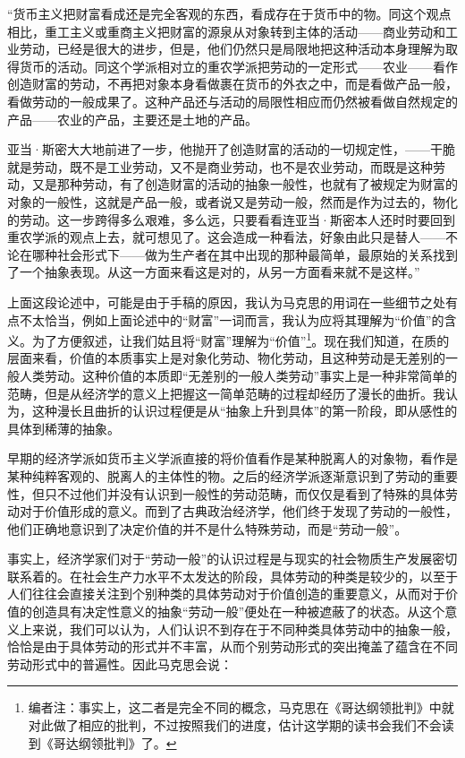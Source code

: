 \documentclass[a4paper,twoside,12pt,AutoFakeBold]{ctexart}
\begin{document}
\begin{adjustwidth}{2em}{2em}
    \qquad\fangsong
“货币主义把财富看成还是完全客观的东西，看成存在于货币中的物。同这个观点相比，重工主义或重商主义把财富的源泉从对象转到主体的活动——商业劳动和工业劳动，已经是很大的进步，但是，他们仍然只是局限地把这种活动本身理解为取得货币的活动。同这个学派相对立的重农学派把劳动的一定形式——农业——看作创造财富的劳动，不再把对象本身看做裹在货币的外衣之中，而是看做产品一般，看做劳动的一般成果了。这种产品还与活动的局限性相应而仍然被看做自然规定的产品——农业的产品，主要还是土地的产品。

亚当·斯密大大地前进了一步，他抛开了创造财富的活动的一切规定性，——干脆就是劳动，既不是工业劳动，又不是商业劳动，也不是农业劳动，而既是这种劳动，又是那种劳动，有了创造财富的活动的抽象一般性，也就有了被规定为财富的对象的一般性，这就是产品一般，或者说又是劳动一般，然而是作为过去的，物化的劳动。这一步跨得多么艰难，多么远，只要看看连亚当·斯密本人还时时要回到重农学派的观点上去，就可想见了。这会造成一种看法，好象由此只是替人——不论在哪种社会形式下——做为生产者在其中出现的那种最简单，最原始的关系找到了一个抽象表现。从这一方面来看这是对的，从另一方面看来就不是这样。”
\end{adjustwidth}

上面这段论述中，可能是由于手稿的原因，我认为马克思的用词在一些细节之处有点不太恰当，例如上面论述中的“财富”一词而言，我认为应将其理解为“价值”的含义。为了方便叙述，让我们姑且将“财富”理解为“价值”\footnote{编者注：事实上，这二者是完全不同的概念，马克思在《哥达纲领批判》中就对此做了相应的批判，不过按照我们的进度，估计这学期的读书会我们不会读到《哥达纲领批判》了。}。现在我们知道，在质的层面来看，价值的本质事实上是对象化劳动、物化劳动，且这种劳动是无差别的一般人类劳动。这种价值的本质即“无差别的一般人类劳动”事实上是一种非常简单的范畴，但是从经济学的意义上把握这一简单范畴的过程却经历了漫长的曲折。我认为，这种漫长且曲折的认识过程便是从“抽象上升到具体”的第一阶段，即从感性的具体到稀薄的抽象。

早期的经济学派如货币主义学派直接的将价值看作是某种脱离人的对象物，看作是某种纯粹客观的、脱离人的主体性的物。之后的经济学派逐渐意识到了劳动的重要性，但只不过他们并没有认识到一般性的劳动范畴，而仅仅是看到了特殊的具体劳动对于价值形成的意义。而到了古典政治经济学，他们终于发现了劳动的一般性，他们正确地意识到了决定价值的并不是什么特殊劳动，而是“劳动一般”。

事实上，经济学家们对于“劳动一般”的认识过程是与现实的社会物质生产发展密切联系着的。在社会生产力水平不太发达的阶段，具体劳动的种类是较少的，以至于人们往往会直接关注到个别种类的具体劳动对于价值创造的重要意义，从而对于价值的创造具有决定性意义的抽象“劳动一般”便处在一种被遮蔽了的状态。从这个意义上来说，我们可以认为，人们认识不到存在于不同种类具体劳动中的抽象一般，恰恰是由于具体劳动的形式并不丰富，从而个别劳动形式的突出掩盖了蕴含在不同劳动形式中的普遍性。因此马克思会说：
\end{document}
